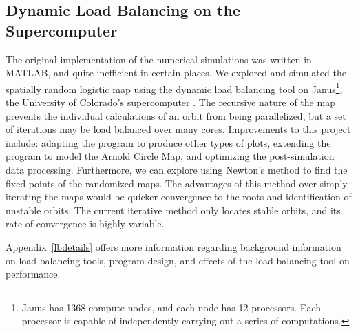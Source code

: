 \subsection{Dynamic Load Balancing on the Supercomputer}
The original implementation of the numerical simulations was written
in MATLAB, and quite inefficient in certain places. We explored and simulated the spatially random logistic map using the
dynamic load balancing tool on Janus\footnote{Janus has 1368 compute nodes, and
  each node has 12 processors. Each processor is capable of
  independently carrying
  out a series of computations.}, the University of Colorado's supercomputer
\cite{janus}. The recursive nature of the map prevents the individual
calculations of an orbit from being parallelized, but a set of
iterations may be load balanced over many
cores. Improvements to this project include: adapting the program to
produce other types of plots, extending the program to model
the Arnold Circle Map, and optimizing the post-simulation data
processing. Furthermore, we can explore using Newton's method to find
the fixed points of the randomized maps. The advantages of this method
over simply iterating the maps would be quicker convergence to the
roots and identification of unstable orbits. The current iterative
method only locates stable orbits, and its rate of convergence is
highly variable. 

Appendix~\ref{lbdetails} offers more information regarding
background information on load balancing tools, program design, and effects of the load balancing tool on performance.